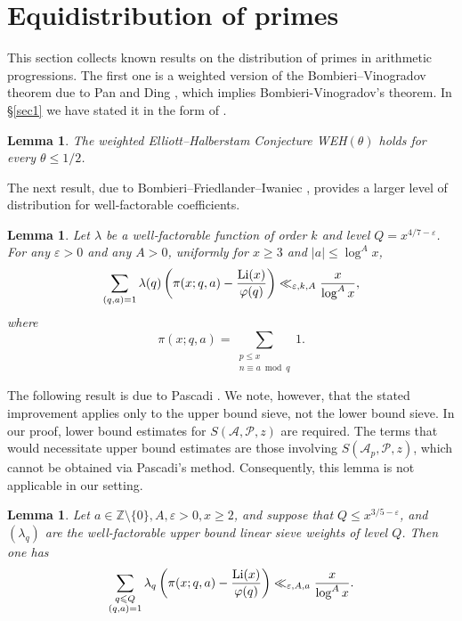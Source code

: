 \documentclass[12pt, a4paper]{amsart}
\def\Li{\hbox{{\rm Li}}}
\def\leq{\leqslant}
\def\geq{\geqslant}
\def\le{\leqslant}
\def\ge{\geqslant}
\theoremstyle{plain}
\newtheorem{lemma}[proposition]{Lemma}
\theoremstyle{remark}
\numberwithin{equation}{section}
\begin{document}
\section{Equidistribution of primes}\label{sec3} 

This section collects known results on the distribution of primes in arithmetic progressions.  
The first one is a weighted version of the Bombieri--Vinogradov theorem due to Pan and Ding \cite{PanDing79}, 
which implies Bombieri-Vinogradov's theorem. In \S\ref{sec1} we have stated it in the form of \cite[\S 8]{PanPan92}.

\begin{lemma}\label{BV-New}
The weighted Elliott--Halberstam Conjecture {\rm WEH}$(\theta)$ holds for every $\theta \le 1/2$.
\end{lemma}

The next result, due to Bombieri--Friedlander--Iwaniec \cite[Theorem 10]{BFI86}, provides a larger level of distribution for well‑factorable coefficients.

\begin{lemma}\label{BFI}
Let $\lambda$ be a well‑factorable function of order $k$ and level $Q = x^{4/7 - \varepsilon}$.  
For any $\varepsilon > 0$ and any $A>0$, uniformly for $x \ge 3$ and $|a| \le \log^A x$,
		$$
		\sum_{\substack{(q,a)=1}} \lambda(q) \left( \pi(x; q, a) - \frac{\Li(x)}{\varphi(q)} \right) \ll_{\varepsilon, k, A} \frac{x}{ \log^A x},
		$$
		where
		$$ 
		\pi(x; q, a)  =
		\sum_{\substack{p \le x\\n \equiv a \bmod q}} 1.
		$$
\end{lemma}

The following result is due to Pascadi \cite[Theorem 1.2(ii)]{Pas24}. We note, however, that the stated improvement applies only to the upper bound sieve, not the lower bound sieve. 
In our proof, lower bound estimates for \( S(\mathscr{A}, \mathscr{P}, z) \) are required. The terms 
that would necessitate upper bound estimates are those involving \( S(\mathscr{A}_p, \mathscr{P}, z) \), 
which cannot be obtained via Pascadi’s method. Consequently, this lemma is not applicable in our setting.

\begin{lemma}\label{Pascadi}
Let  $a \in \mathbb{Z} \setminus \{0\},  A, \varepsilon > 0,   x \geq 2$, and suppose that $Q \leq x^{3/5 - \varepsilon}$, 
and   $(\lambda_q)$   are the well-factorable upper bound linear sieve weights of level  $Q$. Then one has
$$
\sum_{\substack{q \leq Q \\ (q,a)=1}} \lambda_q \left( \pi(x; q, a) - \frac{\Li(x)}{\varphi(q)} \right) \ll_{\varepsilon, A, a} \frac{x}{\log^A x}. 
$$
\end{lemma}
	
\end{document}
